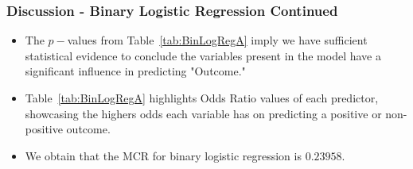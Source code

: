 \documentclass{beamer}
\begin{document}
\begin{frame}
    \frametitle{Discussion - Binary Logistic Regression Continued}
    \begin{itemize}
        \item The $p-$values from Table~\ref{tab:BinLogRegA} imply we have sufficient statistical evidence to conclude the variables present in the model have a significant influence in predicting "Outcome."
    \end{itemize}
    \begin{itemize}
        \item Table~\ref{tab:BinLogRegA} highlights Odds Ratio values of each predictor, showcasing the highers odds each variable has on predicting a  positive or non-positive outcome. 
    \end{itemize}
    \vspace{-0.3cm} %
    \begin{table}
        \centering
        \caption{Binary Logistic Regression Reduced Model Output with Odds Ratio}
        \label{tab:BinLogRegA}
    \end{table}
    \vspace{-0.5cm} %
    \begin{itemize}
        \item We obtain that the MCR for binary logistic regression is $0.23958.$
    \end{itemize}
\end{frame}
\end{document}
